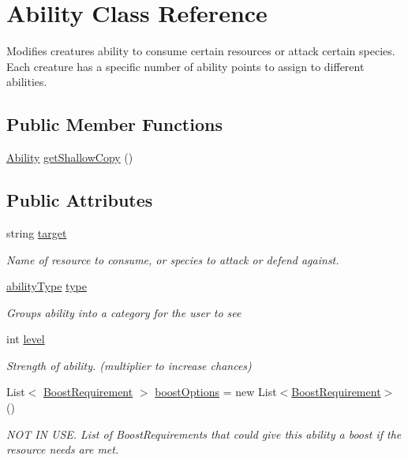 \hypertarget{class_ability}{}\section{Ability Class Reference}
\label{class_ability}


Modifies creature\textquotesingle{}s ability to consume certain resources or attack certain species. Each creature has a specific number of ability points to assign to different abilities.  


\subsection*{Public Member Functions}
\begin{DoxyCompactItemize}
\item 
\mbox{\hyperlink{class_ability}{Ability}} \mbox{\hyperlink{class_ability_a633ef57f5e0584a5b28317f790300f7a}{get\+Shallow\+Copy}} ()
\end{DoxyCompactItemize}
\subsection*{Public Attributes}
\begin{DoxyCompactItemize}
\item 
string \mbox{\hyperlink{class_ability_ab843637149d1c6cd3c0f7ee482efb083}{target}}
\begin{DoxyCompactList}\small\item\em Name of resource to consume, or species to attack or defend against. \end{DoxyCompactList}\item 
\mbox{\hyperlink{_abilities_editor_8cs_ae01c380f385ee9eeb03333f20711ab5a}{ability\+Type}} \mbox{\hyperlink{class_ability_ae316cfefaa1ac41f5b24c2d1f41cceba}{type}}
\begin{DoxyCompactList}\small\item\em Groups ability into a category for the user to see \end{DoxyCompactList}\item 
int \mbox{\hyperlink{class_ability_ad7432e0f8cd20857bbc8ff8da0f405c6}{level}}
\begin{DoxyCompactList}\small\item\em Strength of ability. (multiplier to increase chances) \end{DoxyCompactList}\item 
List$<$ \mbox{\hyperlink{class_boost_requirement}{Boost\+Requirement}} $>$ \mbox{\hyperlink{class_ability_ab17185b55f3574f64729cb530848bb97}{boost\+Options}} = new List$<$\mbox{\hyperlink{class_boost_requirement}{Boost\+Requirement}}$>$()
\begin{DoxyCompactList}\small\item\em N\+OT IN U\+SE. List of Boost\+Requirements that could give this ability a boost if the resource needs are met. \end{DoxyCompactList}\end{DoxyCompactItemize}


